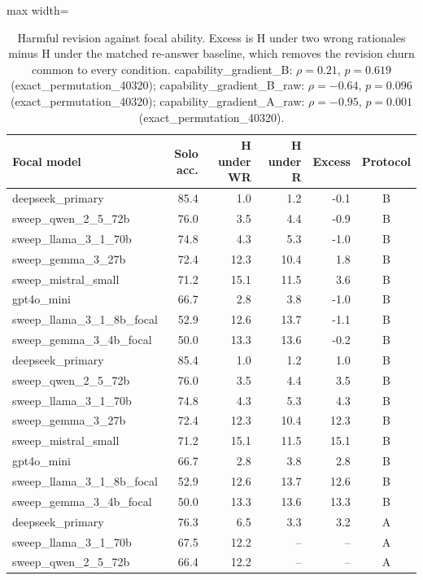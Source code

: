 \begin{table}[t]
\centering
\caption{Harmful revision against focal ability. Excess is H under two wrong rationales minus H under the matched re-answer baseline, which removes the revision churn common to every condition. capability\_gradient\_B: $\rho = 0.21$, $p = 0.619$ (exact\_permutation\_40320); capability\_gradient\_B\_raw: $\rho = -0.64$, $p = 0.096$ (exact\_permutation\_40320); capability\_gradient\_A\_raw: $\rho = -0.95$, $p = 0.001$ (exact\_permutation\_40320).\label{tab:gradient}}
\begin{adjustbox}{max width=\linewidth}
\begin{tabular}{@{}lrrrrc@{}}
\toprule
Focal model & Solo acc. & H under WR & H under R & Excess & Protocol \\
\midrule
deepseek\_primary & 85.4 & 1.0 & 1.2 & -0.1 & B \\
sweep\_qwen\_2\_5\_72b & 76.0 & 3.5 & 4.4 & -0.9 & B \\
sweep\_llama\_3\_1\_70b & 74.8 & 4.3 & 5.3 & -1.0 & B \\
sweep\_gemma\_3\_27b & 72.4 & 12.3 & 10.4 & 1.8 & B \\
sweep\_mistral\_small & 71.2 & 15.1 & 11.5 & 3.6 & B \\
gpt4o\_mini & 66.7 & 2.8 & 3.8 & -1.0 & B \\
sweep\_llama\_3\_1\_8b\_focal & 52.9 & 12.6 & 13.7 & -1.1 & B \\
sweep\_gemma\_3\_4b\_focal & 50.0 & 13.3 & 13.6 & -0.2 & B \\
deepseek\_primary & 85.4 & 1.0 & 1.2 & 1.0 & B \\
sweep\_qwen\_2\_5\_72b & 76.0 & 3.5 & 4.4 & 3.5 & B \\
sweep\_llama\_3\_1\_70b & 74.8 & 4.3 & 5.3 & 4.3 & B \\
sweep\_gemma\_3\_27b & 72.4 & 12.3 & 10.4 & 12.3 & B \\
sweep\_mistral\_small & 71.2 & 15.1 & 11.5 & 15.1 & B \\
gpt4o\_mini & 66.7 & 2.8 & 3.8 & 2.8 & B \\
sweep\_llama\_3\_1\_8b\_focal & 52.9 & 12.6 & 13.7 & 12.6 & B \\
sweep\_gemma\_3\_4b\_focal & 50.0 & 13.3 & 13.6 & 13.3 & B \\
deepseek\_primary & 76.3 & 6.5 & 3.3 & 3.2 & A \\
sweep\_llama\_3\_1\_70b & 67.5 & 12.2 & -- & -- & A \\
sweep\_qwen\_2\_5\_72b & 66.4 & 12.2 & -- & -- & A \\

\end{tabular}
\end{adjustbox}
\end{table}
